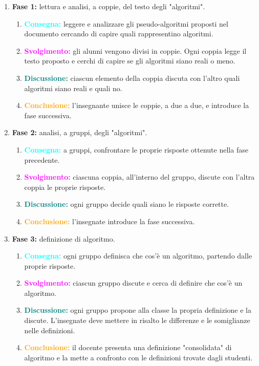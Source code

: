 \begin{enumerate}[label=\roman*.]
    \item \textbf{Fase 1:} lettura e analisi, a coppie, del testo degli "algoritmi".
    \begin{enumerate}
        \item \textbf{\textcolor{cyan}{Consegna:}} leggere e analizzare gli pseudo-algoritmi proposti nel documento cercando di capire quali rappresentino algoritmi.
        \item \textbf{\textcolor{magenta}{Svolgimento:}} gli alunni vengono divisi in coppie. Ogni coppia legge il testo proposto e cerchi di capire se gli algoritmi siano reali o meno. 
        \item \textbf{\textcolor{teal}{Discussione:}} ciascun elemento della coppia discuta con l'altro quali algoritmi siano reali e quali no.
        \item \textbf{\textcolor{orange}{Conclusione:}} l'insegnante unisce le coppie, a due a due, e introduce la fase successiva.
    \end{enumerate}
    \item \textbf{Fase 2:} analisi, a gruppi, degli "algoritmi".
    \begin{enumerate}
        \item \textbf{\textcolor{cyan}{Consegna:}} a gruppi, confrontare le proprie risposte ottenute nella fase precedente.
        \item \textbf{\textcolor{magenta}{Svolgimento:}} ciascuna coppia, all'interno del gruppo, discute con l'altra coppia le proprie risposte. 
        \item \textbf{\textcolor{teal}{Discussione:}} ogni gruppo decide quali siano le risposte corrette.
        \item \textbf{\textcolor{orange}{Conclusione:}} l'insegnate introduce la fase successiva.
    \end{enumerate}
    \item \textbf{Fase 3:} definizione di algoritmo.
    \begin{enumerate}
        \item \textbf{\textcolor{cyan}{Consegna:}} ogni gruppo definisca che cos'è un algoritmo, partendo dalle proprie risposte.
        \item \textbf{\textcolor{magenta}{Svolgimento:}} ciascun gruppo discute e cerca di definire che cos'è un algoritmo. 
        \item \textbf{\textcolor{teal}{Discussione:}} ogni gruppo propone alla classe la propria definizione e la discute. L'insegnate deve mettere in risalto le differenze e le somiglianze nelle definizioni.
        \item \textbf{\textcolor{orange}{Conclusione:}} il docente presenta una definizione "consolidata" di algoritmo e la mette a confronto con le definizioni trovate dagli studenti.
    \end{enumerate}
\end{enumerate}

